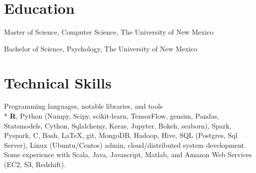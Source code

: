 \documentclass[print]{friggeri-cv} %
\begin{document}
\section{Education}
\begin{description}
  \item {\largeheaderfont Master of Science, Computer Science}, The University
    of New Mexico \hfill 
    {}
  \item  {\largeheaderfont Bachelor of Science, Psychology}, The University of
    New Mexico \hfill
    { }
\end{description}

\section{Technical Skills}
\begin{description}
   \item {\smallheaderfont Programming languages, notable libraries, and tools} \\*
        \textbf{R}, Python (Numpy, Scipy, scikit-learn, TensorFlow, gensim,
        Pandas, Statsmodels, Cython, Sqlalchemy, Keras, Jupyter,
        Bokeh, seaborn), Spark, Pyspark, C, Bash,
        \LaTeX, git, MongoDB, Hadoop, Hive, SQL (Postgres,
        Sql Server), Linux (Ubuntu/Centos) admin, cloud/distributed system development.
        Some experience with Scala, Java, Javascript,
        Matlab, and Amazon Web Services (EC2, S3, Redshift).

\end{description}
\end{document}
